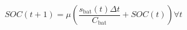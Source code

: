 \begin{equation}
	SOC(t+1) = \mu\left(\frac{s_\text{bat}(t)\Delta t}{C_\text{bat}} + SOC(t)\right) \forall t
	\label{ch1:equ:next-state-of-charge}
\end{equation}